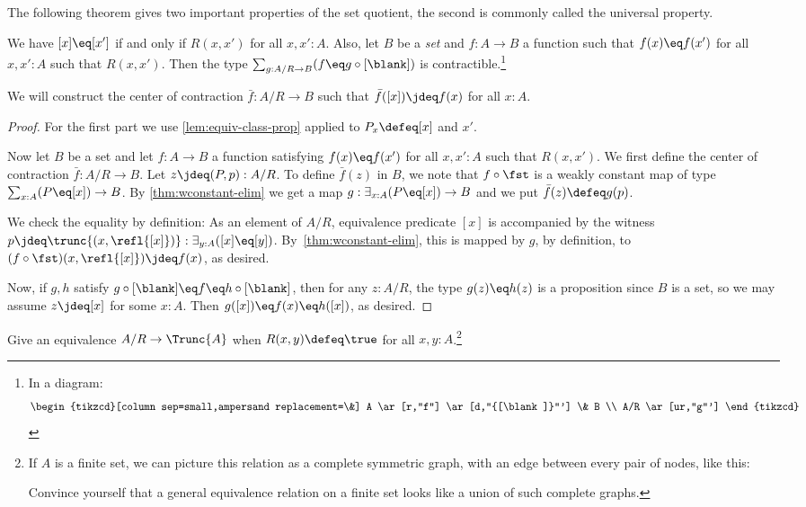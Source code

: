 The following theorem gives two important properties of the set quotient,
the second is commonly called the universal property.

\begin{theorem}\label{thm:quotient-property}
  We have $[x] \eq [x']$ if and only if $R(x,x')$ for all $x,x':A$.
  Also, let $B$ be a \emph{set} and $f : A \to B$ a
  function such that $f(x) \eq f(x')$ for all $x,x':A$ such that $R(x,x')$.
  Then the type $\sum_{g: A/R \to B} (f \eq g\circ[\blank])$ is
  contractible.\footnote{In a diagram:
  \[\begin{tikzcd}[column sep=small,ampersand replacement=\&]
    A \ar[r,"f"] \ar[d,"{[\blank]}"'] \& B \\
    A/R \ar[ur,"g"']
  \end{tikzcd}\]}
\end{theorem}
We will construct the center of contraction $\bar f : A/R \to B$
such that $\bar f([x]) \jdeq f(x)$ for all $x:A$.
\begin{proof}
  For the first part we use \cref{lem:equiv-class-prop}
  applied to $P_x \defeq [x]$ and $x'$.

  Now let $B$ be a set and let $f : A \to B$ a function
  satisfying $f(x) \eq f(x')$ for all $x,x':A$ such that $R(x,x')$.
  We first define the center of contraction $\bar f : A/R \to B$.
  Let $z\jdeq(P,p):A/R$. To define $\bar f(z)$ in $B$,
  we note that $f \circ \fst$ is a weakly constant map
  of type $\sum_{x:A}(P \eq [x]) \to B$. By \cref{thm:wconstant-elim}
  we get a map $g: \exists_{x:A}(P \eq [x]) \to B$ and we put
  $\bar f(z)\defeq g(p)$.

  We check the equality by definition: As an element of $A/R$,
  equivalence predicate $[x]$ is accompanied by the witness
  $p\jdeq \trunc{(x, \refl{[x]})} : \exists_{y:A}([x] \eq [y])$.
  By~\cref{thm:wconstant-elim}, this is mapped by $g$, by definition,
  to $(f \circ \fst)(x, \refl{[x]}) \jdeq f(x)$, as desired.

  Now, if $g,h$ satisfy $g\circ[\blank] \eq f \eq h\circ[\blank]$,
  then for any $z:A/R$, the type $g(z) \eq h(z)$ is a proposition
  since $B$ is a set, so we may assume $z\jdeq [x]$ for some $x:A$.
  Then $g([x]) \eq f(x) \eq h([x])$, as desired.
\end{proof}

\begin{xca}\label{xca:A/True-prop-trunc}
Give an equivalence $A/R \to \Trunc{A}$ when $R(x,y)\defeq\true$
for all $x,y:A$.\footnote{%
  If $A$ is a finite set, we can picture this relation as a complete
  symmetric graph, \ie with an edge between every pair of nodes, like this:\\
  \begin{center}
  \end{center}
  Convince yourself that a general equivalence relation
  on a finite set looks like a union of such complete graphs.}
\end{xca}

